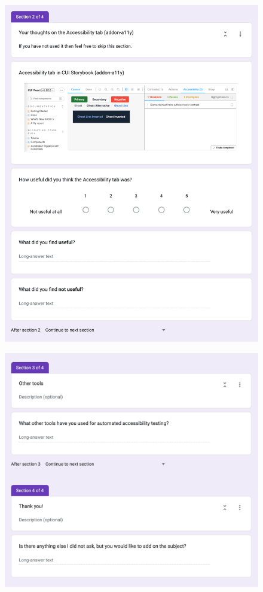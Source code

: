 \documentclass{master_thesis}
\begin{document}
\begin{figure}[H]
	\centering
	\includegraphics[width=\textwidth]{img/surveys/post-survey-3.png}
\end{figure}
\begin{figure}[H]
	\centering
	\includegraphics[width=\textwidth]{img/surveys/post-survey-4.png}
\end{figure}
\clearpage
\end{document}
